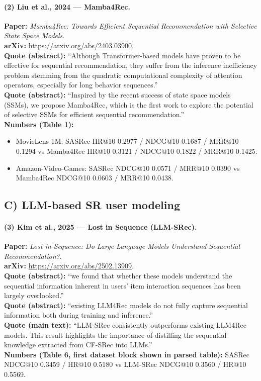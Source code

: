 \documentclass[11pt]{article}
\begin{document}
\paragraph{(2) Liu et al., 2024 --- Mamba4Rec.}
\textbf{Paper:} \emph{Mamba4Rec: Towards Efficient Sequential Recommendation with Selective State Space Models}.\\
\textbf{arXiv:} \url{https://arxiv.org/abs/2403.03900}.\\
\textbf{Quote (abstract):} ``Although Transformer-based models have proven to be effective for sequential recommendation, they suffer from the inference inefficiency problem stemming from the quadratic computational complexity of attention operators, especially for long behavior sequences.''\\
\textbf{Quote (abstract):} ``Inspired by the recent success of state space models (SSMs), we propose Mamba4Rec, which is the first work to explore the potential of selective SSMs for efficient sequential recommendation.''\\
\textbf{Numbers (Table 1):}
\begin{itemize}
  \item MovieLens-1M: SASRec HR@10 0.2977 / NDCG@10 0.1687 / MRR@10 0.1294 vs Mamba4Rec HR@10 0.3121 / NDCG@10 0.1822 / MRR@10 0.1425.
  \item Amazon-Video-Games: SASRec NDCG@10 0.0571 / MRR@10 0.0390 vs Mamba4Rec NDCG@10 0.0603 / MRR@10 0.0438.
\end{itemize}

\subsection{C) LLM-based SR user modeling}
\paragraph{(3) Kim et al., 2025 --- Lost in Sequence (LLM-SRec).}
\textbf{Paper:} \emph{Lost in Sequence: Do Large Language Models Understand Sequential Recommendation?}.\\
\textbf{arXiv:} \url{https://arxiv.org/abs/2502.13909}.\\
\textbf{Quote (abstract):} ``we found that whether these models understand the sequential information inherent in users’ item interaction sequences has been largely overlooked.''\\
\textbf{Quote (abstract):} ``existing LLM4Rec models do not fully capture sequential information both during training and inference.''\\
\textbf{Quote (main text):} ``LLM-SRec consistently outperforms existing LLM4Rec models. This result highlights the importance of distilling the sequential knowledge extracted from CF-SRec into LLMs.''\\
\textbf{Numbers (Table 6, first dataset block shown in parsed table):} SASRec NDCG@10 0.3459 / HR@10 0.5180 vs LLM-SRec NDCG@10 0.3560 / HR@10 0.5569.
\end{document}
